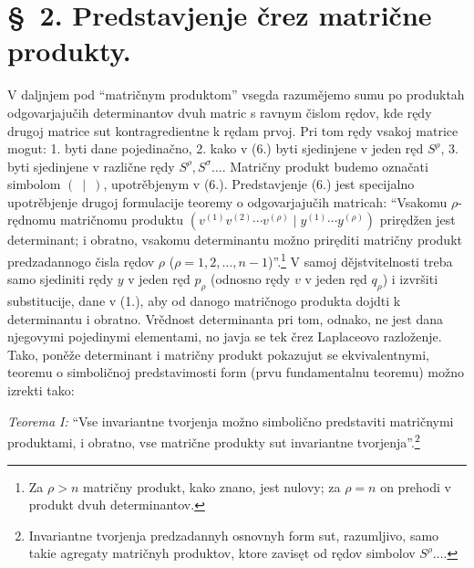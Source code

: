 \documentclass[11pt]{article}
\begin{document}
\section*{\S\ 2. Predstavjenje črez matrične produkty.}

V daljnjem pod ``matričnym produktom'' vsegda razumějemo sumu po produktah odgovarjajučih determinantov dvuh matric s ravnym čislom rędov, kde rędy drugoj matrice sut kontragredientne k rędam prvoj. Pri tom rędy vsakoj matrice mogut: 1. byti dane pojedinačno, 2. kako v (6.) byti sjedinjene v jeden ręd $S^\rho$, 3. byti sjedinjene v različne rędy $S^\rho,S^\sigma\ldots$. Matričny produkt budemo označati simbolom $(\ \mid\ )$, upotrěbjenym v (6.). Predstavjenje (6.) jest specijalno upotrěbjenje drugoj formulacije teoremy o odgovarjajučih matricah: ``Vsakomu $\rho$-rędnomu matričnomu produktu $(v^{(1)}v^{(2)}\cdots v^{(\rho)}\mid y^{(1)}\cdots y^{(\rho)})$ prirędžen jest determinant; i obratno, vsakomu determinantu možno priręditi matričny produkt predzadannogo čisla rędov $\rho$ ($\rho=1,2,\ldots,n-1$)''.\footnote{Za $\rho>n$ matričny produkt, kako znano, jest nulovy; za $\rho=n$ on prehodi v produkt dvuh determinantov.} V samoj dějstvitelnosti treba samo sjediniti rędy $y$ v jeden ręd $p_\rho$ (odnosno rędy $v$ v jeden ręd $q_\rho$) i izvršiti substitucije, dane v (1.), aby od danogo matričnogo produkta dojdti k determinantu i obratno. Vrědnost determinanta pri tom, odnako, ne jest dana njegovymi pojedinymi elementami, no javja se tek črez Laplaceovo razloženje. Tako, poněže determinant i matričny produkt pokazujut se ekvivalentnymi, teoremu o simboličnoj predstavimosti form (prvu fundamentalnu teoremu) možno izrekti tako:

\emph{Teorema I:} ``Vse invariantne tvorjenja možno simbolično predstaviti matričnymi produktami, i obratno, vse matrične produkty sut invariantne tvorjenja''.\footnote{Invariantne tvorjenja predzadannyh osnovnyh form sut, razumljivo, samo takie agregaty matričnyh produktov, ktore zavisęt od rędov simbolov $S^\rho\ldots$.}
\end{document}
